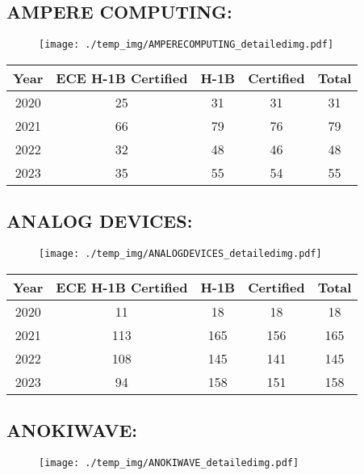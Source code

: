 \documentclass{article}%
\begin{document}
%
\newpage%
\subsection{AMPERE COMPUTING:}%
\label{subsec:AMPERECOMPUTING}%
\label{AMPERECOMPUTINGdetailed}%


\begin{figure}[htbp]%
\centering%
\texttt{[image: ./temp\_img/AMPERECOMPUTING\_detailedimg.pdf]}%
\end{figure}

%
\begin{longtable}{c|c|c|c|c}%
\hline%
Year&ECE H{-}1B Certified&H{-}1B&Certified&Total\\%
\hline%
2020&25&31&31&31\\%
\hline%
2021&66&79&76&79\\%
\hline%
2022&32&48&46&48\\%
\hline%
2023&35&55&54&55\\%
\hline%
\end{longtable}

%
\newpage%
\subsection{ANALOG DEVICES:}%
\label{subsec:ANALOGDEVICES}%
\label{ANALOGDEVICESdetailed}%


\begin{figure}[htbp]%
\centering%
\texttt{[image: ./temp\_img/ANALOGDEVICES\_detailedimg.pdf]}%
\end{figure}

%
\begin{longtable}{c|c|c|c|c}%
\hline%
Year&ECE H{-}1B Certified&H{-}1B&Certified&Total\\%
\hline%
2020&11&18&18&18\\%
\hline%
2021&113&165&156&165\\%
\hline%
2022&108&145&141&145\\%
\hline%
2023&94&158&151&158\\%
\hline%
\end{longtable}

%
\newpage%
\subsection{ANOKIWAVE:}%
\label{subsec:ANOKIWAVE}%
\label{ANOKIWAVEdetailed}%


\begin{figure}[htbp]%
\centering%
\texttt{[image: ./temp\_img/ANOKIWAVE\_detailedimg.pdf]}%
\end{figure}
\end{document}
